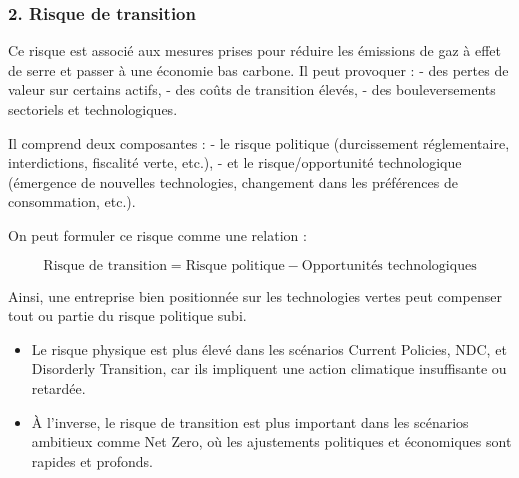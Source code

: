 \documentclass[
  letterpaper,
  DIV=11,
  numbers=noendperiod]{scrartcl}
\providecommand{\tightlist}{%
  \setlength{\itemsep}{0pt}\setlength{\parskip}{0pt}}\usepackage{longtable,booktabs,array}
\begin{document}
\subsubsection{2. Risque de transition}\label{risque-de-transition}

Ce risque est associé aux mesures prises pour réduire les émissions de
gaz à effet de serre et passer à une économie bas carbone. Il peut
provoquer : - des pertes de valeur sur certains actifs, - des coûts de
transition élevés, - des bouleversements sectoriels et technologiques.

Il comprend deux composantes : - le risque politique (durcissement
réglementaire, interdictions, fiscalité verte, etc.), - et le
risque/opportunité technologique (émergence de nouvelles technologies,
changement dans les préférences de consommation, etc.).

On peut formuler ce risque comme une relation :

\[
\text{Risque de transition} = \text{Risque politique} - \text{Opportunités technologiques}
\]

Ainsi, une entreprise bien positionnée sur les technologies vertes peut
compenser tout ou partie du risque politique subi.

\begin{itemize}
\tightlist
\item
  Le risque physique est plus élevé dans les scénarios Current Policies,
  NDC, et Disorderly Transition, car ils impliquent une action
  climatique insuffisante ou retardée.
\item
  À l'inverse, le risque de transition est plus important dans les
  scénarios ambitieux comme Net Zero, où les ajustements politiques et
  économiques sont rapides et profonds.
\end{itemize}
\end{document}
